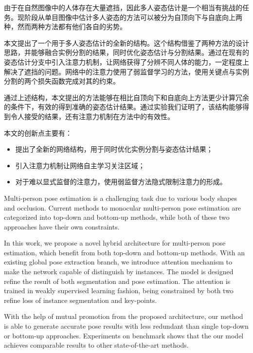 \begin{cabstract}
  由于在自然图像中的人体存在大量遮挡，因此多人姿态估计是一个相当有挑战的任务。现阶段从单目图像中估计多人姿态的方法可以被分为自顶向下与自底向上两种，然而两种方法都有他们各自的劣势。
  
  本文提出了一个用于多人姿态估计的全新的结构。这个结构借鉴了两种方法的设计思路，并能够融合实例分割的结果，同时优化姿态估计与分割结果。通过在现有的姿态估计分支中引入注意力机制，让网络获得了分辨不同人体的能力，一定程度上解决了遮挡的问题。网络中的注意力使用了弱监督学习的方法，使用关键点与实例分割的两个损失函数完成对其的约束。
  
  通过上述结构，本文提出的方法能够在相比自顶向下和自底向上方法更少计算冗余的条件下，有效的得到准确的姿态估计结果。通过实验我们证明了，该结构能够得到令人接受的结果，还有注意力机制在方法中的有效性。

  本文的创新点主要有：
  \begin{itemize}
    \item 提出了全新的网络结构，用于同时优化实例分割与姿态估计结果；
    \item 引入注意力机制让网络自主学习关注区域；
    \item 对于难以显式监督的注意力，使用弱监督方法隐式限制注意力的形成。
  \end{itemize}

\end{cabstract}


\begin{eabstract}
Multi-person pose estimation is a challenging task due to various body shapes and occlusion. Current methods to monocular multi-person pose estimation are categorized into top-down and bottom-up methods, while both of these two approaches have their own constraints.

In this work, we propose a novel hybrid architecture for multi-person pose estimation, which benefit from both top-down and bottom-up methods. With an existing global pose extraction branch, we introduce attention mechanism to make the network capable of distinguish by instances. The model is designed refine the result of both segmentation and pose estimation. The attention is trained in weakly supervised learning fashion, being constrained by both two refine loss of instance segmentation and key-points.

With the help of mutual promotion from the proposed architecture, our method is able to generate accurate pose results with less redundant than single top-down or bottom-up approaches. Experiments on benchmark shows that the our model achieves comparable results to other state-of-the-art methods.
\end{eabstract}

